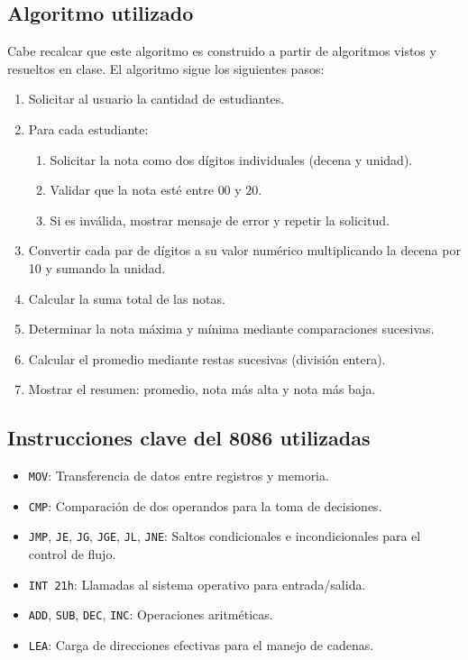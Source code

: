 \documentclass[12pt,a4paper]{article}
\begin{document}
\subsection{Algoritmo utilizado}

Cabe recalcar que este algoritmo es construido a partir de algoritmos vistos y resueltos en clase.
\newline
El algoritmo sigue los siguientes pasos:

\begin{enumerate}
    \item Solicitar al usuario la cantidad de estudiantes.
    \item Para cada estudiante:
    \begin{enumerate}
        \item Solicitar la nota como dos d\'igitos individuales (decena y unidad).
        \item Validar que la nota est\'e entre 00 y 20.
        \item Si es inv\'alida, mostrar mensaje de error y repetir la solicitud.
    \end{enumerate}
    \item Convertir cada par de d\'igitos a su valor num\'erico multiplicando la decena por 10 y sumando la unidad.
    \item Calcular la suma total de las notas.
    \item Determinar la nota m\'axima y m\'inima mediante comparaciones sucesivas.
    \item Calcular el promedio mediante restas sucesivas (divisi\'on entera).
    \item Mostrar el resumen: promedio, nota m\'as alta y nota m\'as baja.
\end{enumerate}

\subsection{Instrucciones clave del 8086 utilizadas}

\begin{itemize}
    \item \texttt{MOV}: Transferencia de datos entre registros y memoria.
    \item \texttt{CMP}: Comparaci\'on de dos operandos para la toma de decisiones.
    \item \texttt{JMP}, \texttt{JE}, \texttt{JG}, \texttt{JGE}, \texttt{JL}, \texttt{JNE}: Saltos condicionales e incondicionales para el control de flujo.
    \item \texttt{INT 21h}: Llamadas al sistema operativo para entrada/salida.
    \item \texttt{ADD}, \texttt{SUB}, \texttt{DEC}, \texttt{INC}: Operaciones aritm\'eticas.
    \item \texttt{LEA}: Carga de direcciones efectivas para el manejo de cadenas.
\end{itemize}
\end{document}
